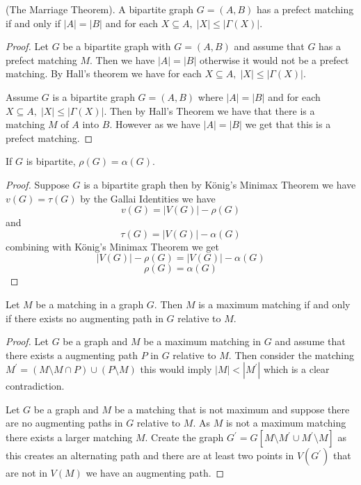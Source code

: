 \documentclass[12pt]{article}
\newenvironment{theorem}[2][Theorem]{\begin{trivlist}
\item[\hskip \labelsep {\bfseries #1}\hskip \labelsep {\bfseries #2.}]}{\end{trivlist}}
\newenvironment{corollary}[2][Corollary]{\begin{trivlist}
\item[\hskip \labelsep {\bfseries #1}\hskip \labelsep {\bfseries #2.}]}{\end{trivlist}}
\begin{document}
\begin{corollary}
    {1.1.4}(The Marriage Theorem). A bipartite graph $G=(A,B)$ has a prefect matching if and only if $|A|=|B|$ and for each $X\subseteq A,\; |X|\leq |\Gamma(X)|$.
\end{corollary}
\begin{proof}
    Let $G$ be a bipartite graph with $G=(A,B)$ and assume that $G$ has a prefect matching $M$. Then we have $|A|=|B|$ otherwise it would not be a prefect matching. By Hall's theorem we have for each $X\subseteq A,\; |X|\leq |\Gamma(X)|$.


    Assume $G$ is a bipartite graph $G=(A,B)$ where $|A|=|B|$ and for each $X \subseteq A,\; |X|\leq |\Gamma(X)|$. Then by Hall's Theorem we have that there is a matching $M$ of $A$ into $B$. However as we have $|A|=|B|$ we get that this is a prefect matching.
\end{proof}


\begin{corollary}
    {1.1.7}
    If $G$ is bipartite, $\rho(G)=\alpha(G)$.
\end{corollary}
\begin{proof}
    Suppose $G$ is a bipartite graph then by König's Minimax Theorem we have $v(G)=\tau(G)$ by the Gallai Identities we have $$v(G)=|V(G)|-\rho(G)$$ and $$\tau(G)=|V(G)|-\alpha(G)$$ combining with König's Minimax Theorem we get $$|V(G)|-\rho(G)=|V(G)|-\alpha(G)$$
    $$\rho(G)=\alpha(G)$$
\end{proof}

\begin{theorem}
    {1.2.1}
    Let $M$ be a matching in a graph $G$. Then $M$ is a maximum matching if and only if there exists no augmenting path in $G$ relative to $M$.
\end{theorem}


\begin{proof}

    Let $G$ be a graph and $M$ be a maximum matching in $G$ and assume that there exists a augmenting path $P$ in $G$ relative to $M$. Then consider the matching $M^\prime = (M \setminus M \cap P) \cup (P \setminus M)$ this would imply $|M|< |M^\prime|$ which is a clear contradiction.


    Let $G$ be a graph and $M$ be a matching that is not maximum and suppose there are no augmenting paths in $G$ relative to $M$. As $M$ is not a maximum matching there exists a larger matching $M$. Create the graph $G^\prime =G[M\setminus M^{\prime} \cup M^{\prime}\setminus M]$ as this creates an alternating path and there are at least two points in $V(G^\prime)$ that are not in $V(M)$ we have an augmenting path.
\end{proof}
\end{document}
